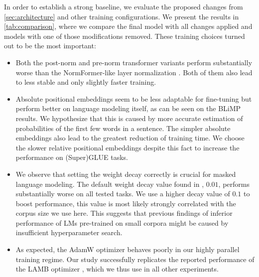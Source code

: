     In order to establish a strong baseline, we evaluate the proposed changes from \cref{sec:architecture} and other training configurations. We present the results in \cref{tab:comparison}, where we compare the final model with all changes applied and models with one of those modifications removed. These training choices turned out to be the most important:
    \begin{itemize}\itemsep0em
        \item Both the post-norm and pre-norm transformer variants perform substantially worse than the NormFormer-like layer normalization \citep{shleifer2022normformer}. Both of them also lead to less stable and only slightly faster training.
        \item Absolute positional embeddings seem to be less adaptable for fine-tuning but perform better on language modeling itself, as can be seen on the BLiMP results. We hypothesize that this is caused by more accurate estimation of probabilities of the first few words in a sentence. The simpler absolute embeddings also lead to the greatest reduction of training time. We choose the slower relative positional embeddings despite this fact to increase the performance on (Super)GLUE tasks.
        \item We observe that setting the weight decay correctly is crucial for masked language modeling. The default weight decay value found in , $0.01$, performs substantially worse on all tested tasks. We use a higher decay value of $0.1$ to boost performance, this value is most likely strongly correlated with the corpus size we use here. This suggests that previous findings of inferior performance of LMs pre-trained on small corpora might be caused by insufficient hyperparameter search.
        \item As expected, the AdamW optimizer \citep{loshchilov2018decoupled} behaves poorly in our highly parallel training regime. Our study successfully replicates the reported performance of the LAMB optimizer \citep{You2020Large}, which we thus use in all other experiments. 
    \end{itemize}

